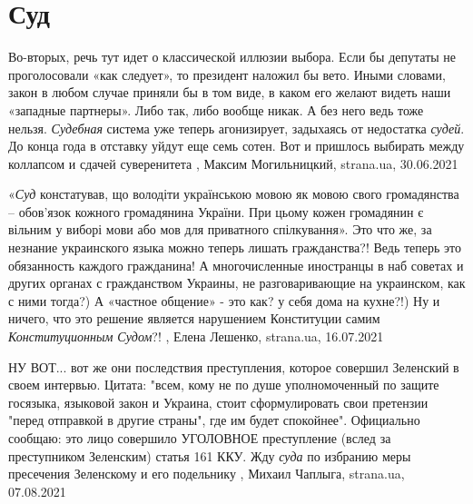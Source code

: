  
 
 
 
 
\chapter{Суд}
\label{sec:slova.sud}

Во-вторых, речь тут идет о классической иллюзии выбора. Если бы депутаты не
проголосовали «как следует», то президент наложил бы вето. Иными словами, закон
в любом случае приняли бы в том виде, в каком его желают видеть наши «западные
партнеры». Либо так, либо вообще никак.  А без него ведь тоже нельзя. \emph{Судебная}
система уже теперь агонизирует, задыхаясь от недостатка \emph{судей}. До конца года в
отставку уйдут еще семь сотен. Вот и пришлось выбирать между коллапсом и сдачей
суверенитета
, 
Максим Могильницкий, strana.ua, 30.06.2021

«\emph{Суд} констатував, що володіти українською мовою як мовою свого громадянства –
обов’язок кожного громадянина України. При цьому кожен громадянин є вільним у
виборі мови або мов для приватного спілкування».
Это что же, за незнание украинского языка можно теперь лишать гражданства?!
Ведь теперь это обязанность каждого гражданина!
А многочисленные иностранцы в наб советах и других органах с гражданством
Украины, не разговаривающие на украинском, как с ними тогда?)
А «частное общение» - это как? у себя дома на кухне?!)
Ну и ничего, что это решение является нарушением Конституции самим
\emph{Конституционным Судом}?!
, 
Елена Лешенко, strana.ua, 16.07.2021


НУ ВОТ... вот же они последствия преступления, которое совершил Зеленский в
своем интервью.  Цитата: "всем, кому не по душе уполномоченный по защите
госязыка, языковой закон и Украина, стоит сформулировать свои претензии "перед
отправкой в другие страны", где им будет спокойнее".  Официально сообщаю: это
лицо совершило УГОЛОВНОЕ преступление (вслед за преступником Зеленским) статья
161 ККУ.  Жду \emph{суда} по избранию меры пресечения Зеленскому и его
подельнику
, 
Михаил Чаплыга, strana.ua, 07.08.2021
